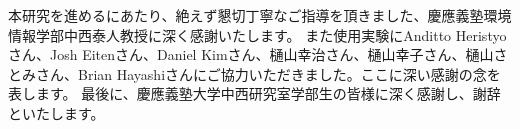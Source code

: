 
\begin{acknowledgment}
本研究を進めるにあたり、絶えず懇切丁寧なご指導を頂きました、慶應義塾環境情報学部中西泰人教授に深く感謝いたします。 また使用実験にAnditto Heristyoさん、Josh Eitenさん、Daniel Kimさん、樋山幸治さん、樋山幸子さん、樋山さとみさん、Brian Hayashiさんにご協力いただきました。ここに深い感謝の念を表します。 最後に、慶應義塾大学中西研究室学部生の皆様に深く感謝し、謝辞といたします。 
\end{acknowledgment}
